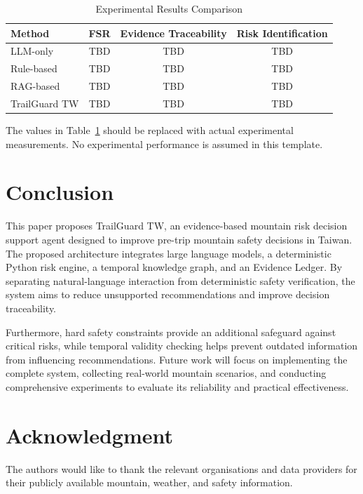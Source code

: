 \documentclass[conference]{IEEEtran}
\begin{document}
\begin{table}[t]
\caption{Experimental Results Comparison}
\label{tab:results}
\centering
\begin{tabular}{lccc}
\toprule
Method & FSR & Evidence Traceability & Risk Identification \\
\midrule
LLM-only & TBD & TBD & TBD \\
Rule-based & TBD & TBD & TBD \\
RAG-based & TBD & TBD & TBD \\
TrailGuard TW & TBD & TBD & TBD \\
\bottomrule
\end{tabular}
\end{table}

The values in Table~\ref{tab:results} should be replaced with actual experimental measurements. No experimental performance is assumed in this template.

\section{Conclusion}
This paper proposes TrailGuard TW, an evidence-based mountain risk decision support agent designed to improve pre-trip mountain safety decisions in Taiwan. The proposed architecture integrates large language models, a deterministic Python risk engine, a temporal knowledge graph, and an Evidence Ledger. By separating natural-language interaction from deterministic safety verification, the system aims to reduce unsupported recommendations and improve decision traceability.

Furthermore, hard safety constraints provide an additional safeguard against critical risks, while temporal validity checking helps prevent outdated information from influencing recommendations. Future work will focus on implementing the complete system, collecting real-world mountain scenarios, and conducting comprehensive experiments to evaluate its reliability and practical effectiveness.

\section*{Acknowledgment}
The authors would like to thank the relevant organisations and data providers for their publicly available mountain, weather, and safety information.

\balance


\end{document}

